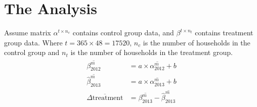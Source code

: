 \documentclass{beamer}
\begin{document}





\section{The Analysis}

\begin{frame}
  Assume matrix $\alpha^{t \times n_c}$ contains control group data, and $\beta^{t \times n_t}$ contains treatment group data. Where $t = 365 \times 48 = 17520$, $n_c$ is the number of households in the control group and $n_t$ is the number of households in the treatment group.
  \begin{align}
    \begin{split}
      \overline{\beta^m_{2012}} &= a \times \overline{\alpha^m_{2012}} + b \\
      \overline{\hat{\beta}^m_{2013}} &= a \times \overline{\alpha^m_{2013}} + b \\
      \overline{\Delta\mbox{treatment}} &= \overline{\beta^m_{2013}} - \overline{\hat{\beta}^m_{2013}}
    \end{split}
  \end{align}
\end{frame}
\end{document}
